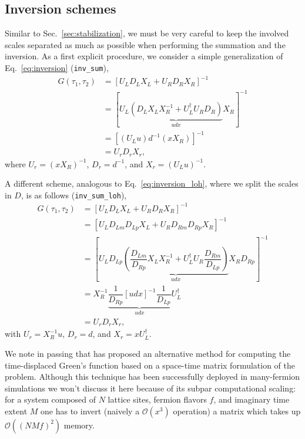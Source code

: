 \documentclass[submission, Phys]{SciPost}
\begin{document}
\subsection{Inversion schemes}
Similar to Sec.~\ref{sec:stabilization}, we must be very careful to keep the involved scales separated as much as possible when performing the summation and the inversion.
As a first explicit procedure, we consider a simple generalization of Eq.~\ref{eq:inversion} (\texttt{inv\_sum}),
\begin{align}
	G(\tau_1, \tau_2) &= [U_L D_L X_L + U_R D_R X_R]^{-1} \nonumber\\
	&= [U_L \underbrace{(D_L X_L X_R^{-1} + U_L^\dagger U_R D_R)}_{udx} X_R ]^{-1} \nonumber\\
	&= [(U_L u) d^{-1} (x X_R)]^{-1} \label{eq:inversion_tdgf}\\
	&= U_r D_r X_r, \nonumber 
\end{align}
where $U_r = (x X_R)^{-1}$, $D_r = d^{-1}$, and $X_r = (U_L u)^{-1}$.

A different scheme, analogous to Eq.~\ref{eq:inversion_loh}, where we split the scales in $D$, is as follows (\texttt{inv\_sum\_loh}), \cite{Loh2005}
\begin{align}
	G(\tau_1, \tau_2) &= [U_L D_L X_L + U_R D_R X_R]^{-1} \nonumber\\
	&= [U_L D_{Lm} D_{Lp} X_L + U_R D_{Rm} D_{Rp} X_R]^{-1} \nonumber\\
	&= \left[U_L D_{Lp} \underbrace{\left( \dfrac{D_{Lm}}{D_{Rp}} X_L X_R^{-1} + U_L^\dagger U_R \dfrac{D_{Rm}}{D_{Lp}} \right)}_{udx} X_R D_{Rp} \right]^{-1} \nonumber\\
	&= X_R^{-1} \underbrace{\dfrac{1}{D_{Rp}} [udx]^{-1} \dfrac{1}{D_{Lp}}}_{udx} U_L^\dagger \label{eq:inversion_tdgf_loh} \\
	&= U_r D_r X_r, \nonumber
\end{align}
with $U_r = X_R^{-1} u$, $D_r = d$, and $X_r = x U_L^\dagger$.

We note in passing that \cite{Hirsch1988} has proposed an alternative method for computing the time-displaced Green's function based on a space-time matrix formulation of the problem. Although this technique has been successfully deployed in many-fermion simulations we won't discuss it here because of its subpar computational scaling: for a system composed of $N$ lattice sites, fermion flavors $f$, and imaginary time extent $M$ one has to invert (naively a $\mathcal{O}(x^3)$ operation) a matrix which takes up $\mathcal{O}((NMf)^2)$ memory.
\end{document}
